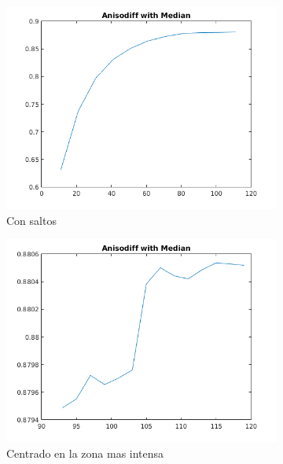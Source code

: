 \begin{figure}[H]
	\centering
	\begin{subfigure}[b]{0.48\textwidth}
        \includegraphics[width=1\textwidth]{./Figures/Results/anisodiffWithMedianJump.png}
        \caption{Con saltos}
        \label{fig:thermalforanisodiffwithmediana}
  \end{subfigure}
  \begin{subfigure}[b]{0.48\textwidth}
        \includegraphics[width=1\textwidth]{./Figures/Results/anisodiffWithMedianCentrado.png}
        \caption{Centrado en la zona mas intensa}
        \label{fig:thermalforanisodiffwithmedianacentered}
  \end{subfigure}
  \begin{subfigure}[b]{0.48\textwidth}

\end{subfigure}
\end{figure}
